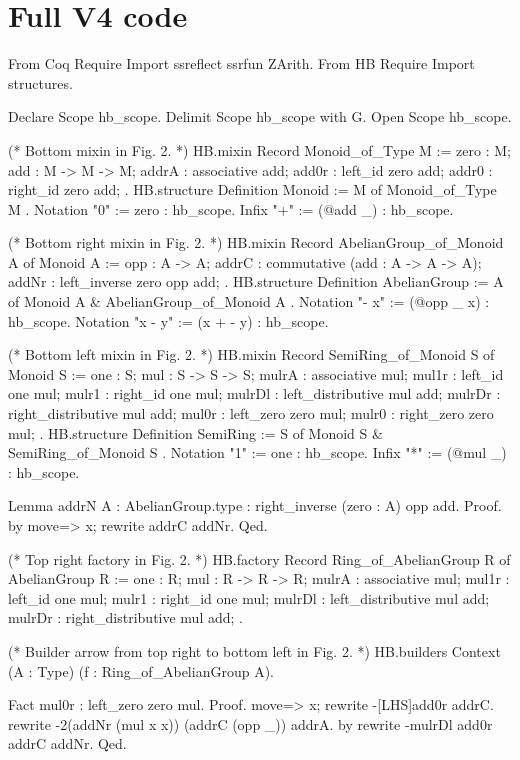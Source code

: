 \documentclass[a4paper,UKenglish,cleveref, autoref]{lipics-v2019}
\theoremstyle{implem}
\theoremstyle{implem}
\theoremstyle{command}
\theoremstyle{commands}
\begin{document}
{{\section{Full V4 code}
\label{sec:full-v4-code}
\begin{coqcode}
From Coq Require Import ssreflect ssrfun ZArith.
From HB Require Import structures.

Declare Scope hb_scope.
Delimit Scope hb_scope with G.
Open Scope hb_scope.

(* Bottom mixin in Fig. 2. *)
HB.mixin Record Monoid_of_Type M := {
  zero : M;
  add : M -> M -> M;
  addrA : associative add;
  add0r : left_id zero add;
  addr0 : right_id zero add;
}.
HB.structure Definition Monoid := { M of Monoid_of_Type M }.
Notation "0" := zero : hb_scope.
Infix "+" := (@add _) : hb_scope.

(* Bottom right mixin in Fig. 2. *)
HB.mixin Record AbelianGroup_of_Monoid A of Monoid A := {
  opp : A -> A;
  addrC : commutative (add : A -> A -> A);
  addNr : left_inverse zero opp add;
}.
HB.structure Definition AbelianGroup := { A of Monoid A & AbelianGroup_of_Monoid A }.
Notation "- x" := (@opp _ x) : hb_scope.
Notation "x - y" := (x + - y) : hb_scope.

(* Bottom left mixin in Fig. 2. *)
HB.mixin Record SemiRing_of_Monoid S of Monoid S := {
  one : S;
  mul : S -> S -> S;
  mulrA : associative mul;
  mul1r : left_id one mul;
  mulr1 : right_id one mul;
  mulrDl : left_distributive mul add;
  mulrDr : right_distributive mul add;
  mul0r : left_zero zero mul;
  mulr0 : right_zero zero mul;
}.
HB.structure Definition SemiRing := { S of Monoid S & SemiRing_of_Monoid S }.
Notation "1" := one : hb_scope.
Infix "*" := (@mul _) : hb_scope.

Lemma addrN {A : AbelianGroup.type} : right_inverse (zero : A) opp add.
Proof. by move=> x; rewrite addrC addNr. Qed.

(* Top right factory in Fig. 2. *)
HB.factory Record Ring_of_AbelianGroup R of AbelianGroup R := {
  one : R;
  mul : R -> R -> R;
  mulrA : associative mul;
  mul1r : left_id one mul;
  mulr1 : right_id one mul;
  mulrDl : left_distributive mul add;
  mulrDr : right_distributive mul add;
}.

(* Builder arrow from top right to bottom left in Fig. 2. *)
HB.builders Context (A : Type) (f : Ring_of_AbelianGroup A).

  Fact mul0r : left_zero zero mul.
  Proof.
  move=> x; rewrite -[LHS]add0r addrC.
  rewrite -{2}(addNr (mul x x)) (addrC (opp _)) addrA.
  by rewrite -mulrDl add0r addrC addNr.
  Qed.


\end{coqcode}}}
\end{document}
